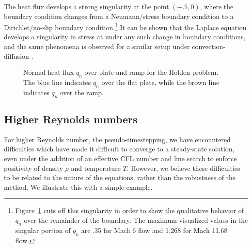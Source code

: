 The heat flux develops a strong singularity at the point $(-.5,0)$, where the boundary condition changes from a Neumann/stress boundary condition to a Dirichlet/no-slip boundary condition.\footnote{Figure~\ref{fig:heatFlux} cuts off this singularity in order to show the qualitative behavior of $q_n$ over the remainder of the boundary.  The maximum visualized values in the singular portion of $q_n$ are .35 for Mach 6 flow and 1.268 for Mach 11.68 flow.}  It can be shown that the Laplace equation develops a singularity in stress at under any such change in boundary conditions, and the same phenomena is observed for a similar setup under convection-diffusion \cite{localConservationDPG}.  

\begin{figure}
\centering
{}
\caption{Normal heat flux $q_n$ over plate and ramp for the Holden problem.  The blue line indicates $q_n$ over the flat plate, while the brown line indicates $q_n$ over the ramp. }
\label{fig:heatFlux}
\end{figure}

\subsection{Higher Reynolds numbers}
For higher Reynolds number, the pseudo-timestepping, we have encountered difficulties which have made it difficult to converge to a steady-state solution, even under the addition of an effective CFL number and line search to enforce positivity of density $\rho$ and temperature $T$.  However, we believe these difficulties to be related to the nature of the equations, rather than the robustness of the method.  We illustrate this with a simple example.  

